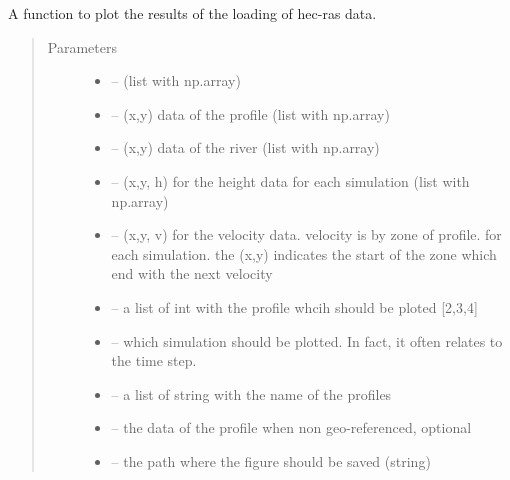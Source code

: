 \documentclass[letterpaper,10pt,english]{sphinxmanual}
\begin{document}

\begin{fulllineitems}
\label{\detokenize{index:src.Hec_ras06.figure_xml}}
A function to plot the results of the loading of hec-ras data.
\begin{quote}\begin{description}
\item[{Parameters}] \leavevmode\begin{itemize}
\item {} 
 -- (list with np.array)

\item {} 
 -- (x,y) data of the profile (list with np.array)

\item {} 
 -- (x,y) data of the river (list with np.array)

\item {} 
 -- (x,y, h) for the height data for each simulation (list with np.array)

\item {} 
 -- (x,y, v) for the velocity data. velocity is by zone of profile. for each simulation.
the (x,y) indicates the start of the zone which end with the next velocity

\item {} 
 -- a list of int with the profile whcih should be ploted {[}2,3,4{]}

\item {} 
 -- which simulation should be plotted. In fact, it often relates to the time step.

\item {} 
 -- a list of string with the name of the profiles

\item {} 
 -- the data of the profile when non geo-referenced, optional

\item {} 
 -- the path where the figure should be saved (string)


\end{itemize}
\end{description}
\end{quote}
\end{fulllineitems}
\end{document}
